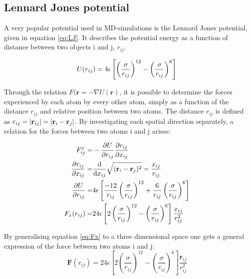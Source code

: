  



\subsection{Lennard Jones potential}

A very popular potential used in MD-simulations is the Lennard Jones potential, given in equation \ref{eq:LJ}. It describes the potential energy as a function of distance between two objects i and j, $ r_{ij} $. 

\begin{equation}\label{eq:LJ}
	U(r_{ij}) = 4\epsilon \left[	\left(\frac{\sigma}{r_{ij}}	\right)^{12}		- \left(\frac{\sigma}{r_{ij}}	\right)^{6}				\right]\\
\end{equation}




Through the relation $ 	F (\textbf{r} = -\nabla U(\textbf{r}) $, it is possible to determine the forces experienced by each atom by every other atom, simply as a function of the distance $ r_{ij} $ and relative position between two atoms. The distance $ r_{ij} $ is defined as  $ r_{ij}  = \abs{\textbf{r}_{ij}} = \abs{\textbf{r}_i - \textbf{r}_j} 	 $. By investigating each spatial direction separately, a relation for the forces between two atoms i and j arises: 

\begin{align}
		F_{ij}^x =& - \pdv{U}{r_{ij}} \pdv{r_{ij}}{x_{ij}}	\\	
		\pdv{r_{ij}}{x_{ij}} 		=& 			 \dv{x_{ij}} \sqrt{ (\textbf{r}_i - \textbf{r}_j)^2}	= \frac{x_{ij}}{r_{ij}}\\
		 \pdv{U}{r_{ij}} =& 4\epsilon \left[\frac{-12}{r_{ij}}\left(	\frac{\sigma}{r_{ij}}\right)^{12}		+  \frac{6}{r_{ij}} \left(\frac{\sigma}{r_{ij}}	\right)^{6}				\right]\\
		 F_x(r_{ij}) =& 24 \epsilon \left[		2	\left(\frac{\sigma}{r_{ij}}	\right)^{12}		- \left(\frac{\sigma}{r_{ij}}	\right)^{6}				\right] \frac{x_{ij}}{r_{ij}^2} \label{eq:Fx}
\end{align}

By generalising equation \ref{eq:Fx} to a three dimensional space one gets a general expression of the force between two atoms i and j: 
\begin{equation}\label{eq:F}
		  \textbf{F}(r_{ij}) = 24 \epsilon \left[		2	\left(\frac{\sigma}{r_{ij}}	\right)^{12}		- \left(\frac{\sigma}{r_{ij}}	\right)^{6}				\right] \frac{\textbf{r}_{ij}}{r_{ij}^2}
\end{equation}

